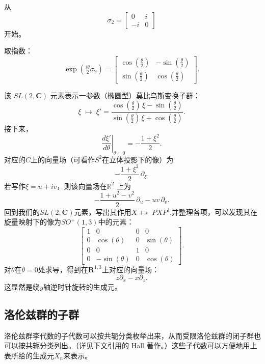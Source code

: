 从
\[
\sigma_{2} =
\begin{bmatrix}
0 & i \\
- i & 0
\end{bmatrix}~
\]
开始。

取指数：
\[
\exp\!\left(\tfrac{i\theta}{2}\sigma_{2}\right) =
\begin{bmatrix}
\cos\!\left(\tfrac{\theta}{2}\right) & -\sin\!\left(\tfrac{\theta}{2}\right) \\
\sin\!\left(\tfrac{\theta}{2}\right) & \cos\!\left(\tfrac{\theta}{2}\right)
\end{bmatrix}.~
\]

该 $SL(2,\mathbf{C})$ 元素表示一参数（椭圆型）莫比乌斯变换子群：
\[
\xi \;\mapsto\; \xi' = 
\frac{\cos\!\left(\tfrac{\theta}{2}\right)\,\xi - \sin\!\left(\tfrac{\theta}{2}\right)}
{\sin\!\left(\tfrac{\theta}{2}\right)\,\xi + \cos\!\left(\tfrac{\theta}{2}\right)}.~
\]
接下来，
\[
\left.\frac{d\xi'}{d\theta}\right|_{\theta = 0}
= -\frac{1+\xi^{2}}{2}.~
\]
对应的$C$上的向量场（可看作$S^{2}$在立体投影下的像）为
\[
-\frac{1+\xi^{2}}{2}\,\partial_{\xi}.~
\]
若写作$\xi = u + iv$，则该向量场在$\mathbb{R}^{2}$ 上为
\[
-\frac{1+u^{2}-v^{2}}{2}\,\partial_{u} - uv\,\partial_{v}.~
\]
回到我们的$SL(2,\mathbf{C})$元素，写出其作用$X \;\mapsto\; PXP^{\dagger}$,并整理各项，可以发现其在旋量映射下的像为$SO^{+}(1,3)$中的元素：
\[
\begin{bmatrix}
1 & 0 & 0 & 0 \\
0 & \cos(\theta) & 0 & \sin(\theta) \\
0 & 0 & 1 & 0 \\
0 & -\sin(\theta) & 0 & \cos(\theta)
\end{bmatrix}.~
\]
对$\theta$在$\theta=0$处求导，得到在$\mathbf{R}^{1,3}$上对应的向量场：
\[
z\partial_{x} - x\partial_{z}.~
\]
这显然是绕$y$轴逆时针旋转的生成元。
\subsection{洛伦兹群的子群}
洛伦兹群李代数的子代数可以按共轭分类枚举出来，从而受限洛伦兹群的闭子群也可以按共轭分类列出。（详见下文引用的 Hall 著作。）这些子代数可以方便地用上表所给的生成元$X_{n}$来表示。

